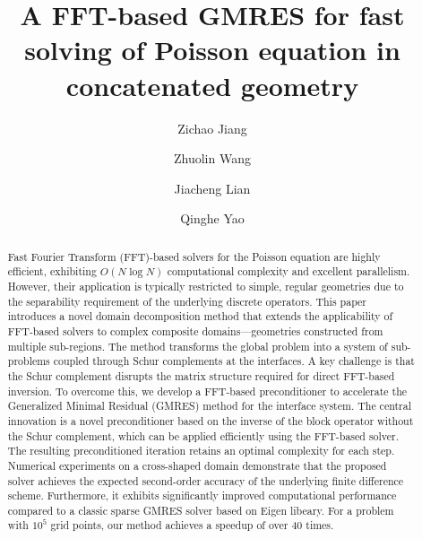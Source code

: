 \documentclass[preprint]{elsarticle}
\begin{document}
\begin{frontmatter}
\title{A FFT-based GMRES for fast solving of Poisson equation in concatenated geometry}





\author[1]{Zichao Jiang}
\author[1]{Zhuolin Wang}
\author[1]{Jiacheng Lian}
\author[1]{Qinghe Yao}
\address[1]{School of Aeronautics and Astronautics, Sun Yat-sen University, Shenzhen 518107, China}

\begin{abstract}
    Fast Fourier Transform (FFT)-based solvers for the Poisson equation are highly efficient, exhibiting $O(N\log N)$ computational complexity and excellent parallelism. However, their application is typically restricted to simple, regular geometries due to the separability requirement of the underlying discrete operators. This paper introduces a novel domain decomposition method that extends the applicability of FFT-based solvers to complex composite domains—geometries constructed from multiple sub-regions. The method transforms the global problem into a system of sub-problems coupled through Schur complements at the interfaces. A key challenge is that the Schur complement disrupts the matrix structure required for direct FFT-based inversion. To overcome this, we develop a FFT-based preconditioner to accelerate the Generalized Minimal Residual (GMRES) method for the interface system. The central innovation is a novel preconditioner based on the inverse of the block operator without the Schur complement, which can be applied efficiently using the FFT-based solver. The resulting preconditioned iteration retains an optimal complexity for each step. Numerical experiments on a cross-shaped domain demonstrate that the proposed solver achieves the expected second-order accuracy of the underlying finite difference scheme. Furthermore, it exhibits significantly improved computational performance compared to a classic sparse GMRES solver based on Eigen libeary. For a problem with $10^5$ grid points, our method achieves a speedup of over 40 times.
\end{abstract}


\end{frontmatter}
\end{document}

